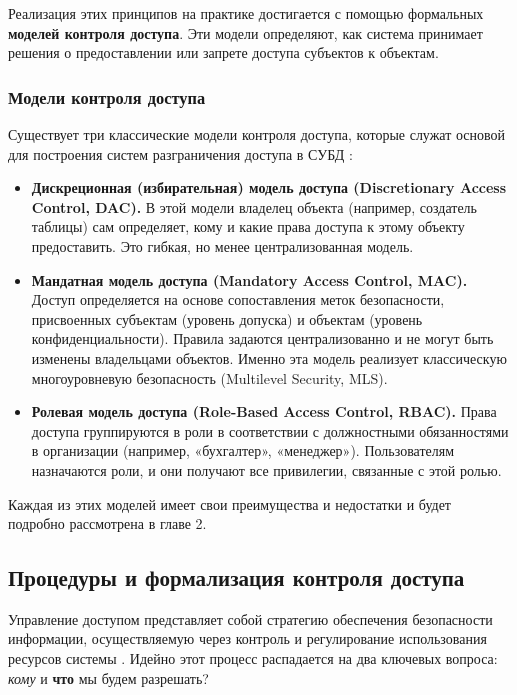 Реализация этих принципов на практике достигается с помощью формальных \textbf{моделей контроля доступа}. Эти модели определяют, как система принимает решения о предоставлении или запрете доступа субъектов к объектам.

\subsubsection{Модели контроля доступа}
Существует три классические модели контроля доступа, которые служат основой для построения систем разграничения доступа в СУБД \autocite{Tanenbaum}:
\begin{itemize}
    \item \textbf{Дискреционная (избирательная) модель доступа (Discretionary Access Control, DAC).} В этой модели владелец объекта (например, создатель таблицы) сам определяет, кому и какие права доступа к этому объекту предоставить. Это гибкая, но менее централизованная модель.
    \item \textbf{Мандатная модель доступа (Mandatory Access Control, MAC).} Доступ определяется на основе сопоставления меток безопасности, присвоенных субъектам (уровень допуска) и объектам (уровень конфиденциальности). Правила задаются централизованно и не могут быть изменены владельцами объектов. Именно эта модель реализует классическую многоуровневую безопасность (Multilevel Security, MLS).
    \item \textbf{Ролевая модель доступа (Role-Based Access Control, RBAC).} Права доступа группируются в роли в соответствии с должностными обязанностями в организации (например, «бухгалтер», «менеджер»). Пользователям назначаются роли, и они получают все привилегии, связанные с этой ролью.
\end{itemize}
Каждая из этих моделей имеет свои преимущества и недостатки и будет подробно рассмотрена в главе 2.

\subsection{Процедуры и формализация контроля доступа}
Управление доступом представляет собой стратегию обеспечения безопасности информации, осуществляемую через контроль и регулирование использования ресурсов системы \autocite[с. 36]{Skakun}. Идейно этот процесс распадается на два ключевых вопроса: \textit{кому} и \textbf{что} мы будем разрешать?

